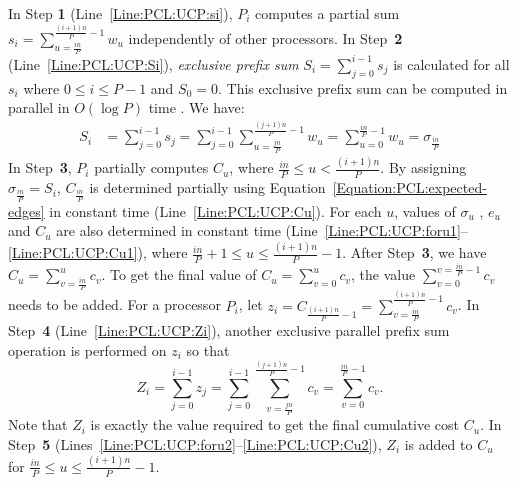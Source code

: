 \documentclass[conference,letterpaper,10pt]{IEEEtran}
\begin{document}
In Step \textbf{1} (Line~\ref{Line:PCL:UCP:si}), $P_{i}$ computes a partial sum $s_{i}=\sum_{u=\frac{in}{P}}^{\frac{(i+1)n}{P}-1}w_u$ independently of other processors. In Step~\textbf{2} (Line~\ref{Line:PCL:UCP:Si}),  \emph{exclusive prefix sum} $S_i = \sum_{j=0}^{i-1}s_j$ is calculated for all $s_{i}$ where $0 \leq i \leq P-1$ and $S_0=0$. This exclusive prefix sum can be computed in parallel in $O(\log P)$ time \cite{Sanders2006}. We have:
\begin{align*}
S_i &=\textstyle \sum_{j=0}^{i-1} s_j = \sum_{j=0}^{i-1} \sum_{u=\frac{jn}{P}}^{\frac{(j+1)n}{P}-1}w_u = \sum_{u=0}^{\frac{in}{P}-1}w_u = \sigma_{\frac{in}{P}}
\end{align*}
In Step~\textbf{3}, $P_i$ partially computes $C_{u}$, where $\frac{in}{P} \leq u < \frac{(i+1)n}{P}$. By assigning $\sigma_{\frac{in}{P}}=S_i$,  $C_{\frac{in}{P}}$ is determined partially using Equation~\ref{Equation:PCL:expected-edges} in constant time (Line~\ref{Line:PCL:UCP:Cu}). For each $u$, values of $\sigma_{u}$ , $e_{u}$ and $C_{u}$ are also determined in constant time (Line~\ref{Line:PCL:UCP:foru1}--\ref{Line:PCL:UCP:Cu1}), where $\frac{in}{P}+1 \leq u \leq \frac{(i+1)n}{P}-1$.  
After Step~\textbf{3}, we have $C_{u}=\sum_{v=\frac{in}{P}}^{u}c_v$. To get the final value of $C_{u}=\sum_{v=0}^{u}c_v$, the value  $\sum_{v=0}^{v=\frac{in}{P}-1}c_v$ needs to be added. For a processor $P_i$, let $z_{i}=C_{\frac{(i+1)n}{P}-1}=\sum_{v=\frac{in}{P}}^{\frac{(i+1)n}{P}-1}c_v$. In Step~\textbf{4} (Line~\ref{Line:PCL:UCP:Zi}), another exclusive parallel prefix sum operation is performed on $z_{i}$ so that $$\textstyle Z_i=\sum_{j=0}^{i-1}z_{j}=\sum_{j=0}^{i-1}\sum_{v=\frac{jn}{P}}^{\frac{(j+1)n}{P}-1}c_v=\sum_{v=0}^{\frac{in}{P}-1}c_v.$$ Note that $Z_{i}$ is exactly the value required to get the final cumulative cost $C_{u}$. In Step~\textbf{5} (Lines~\ref{Line:PCL:UCP:foru2}--\ref{Line:PCL:UCP:Cu2}), $Z_i$ is added to $C_{u}$ for $\frac{in}{P} \leq u \leq \frac{(i+1)n}{P}-1$. 
\end{document}
